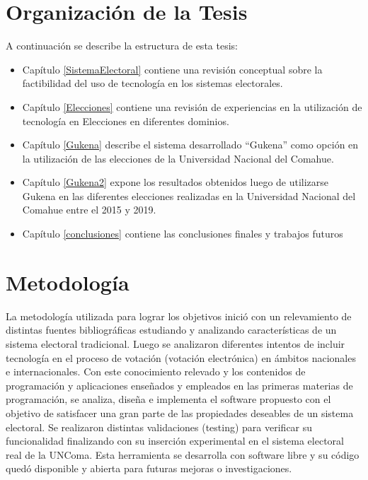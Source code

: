 \section{Organización de la Tesis}
A continuación se describe la estructura de esta tesis:
\begin{itemize}

    \item Capítulo \ref{SistemaElectoral} contiene una revisión conceptual sobre la factibilidad del uso de tecnología
    en los sistemas electorales.
    \item Capítulo \ref{Elecciones} contiene una revisión de experiencias en la utilización de tecnología en  Elecciones en diferentes dominios.
    \item Capítulo \ref{Gukena} describe el sistema desarrollado ``Gukena'' como opción en la utilización de las elecciones de la Universidad Nacional del Comahue.
    \item Capítulo \ref{Gukena2} expone los resultados obtenidos luego de utilizarse Gukena en las diferentes elecciones realizadas en la Universidad Nacional del Comahue entre el 2015 y 2019.
    \item Capítulo \ref{conclusiones} contiene las conclusiones finales y trabajos futuros
\end{itemize}

\section{Metodología}
La metodología utilizada para lograr los objetivos inició con un relevamiento de distintas fuentes bibliográficas estudiando y analizando características de un sistema electoral tradicional.
Luego se analizaron diferentes intentos de incluir tecnología en el proceso de votación (votación electrónica) en ámbitos nacionales e internacionales. Con este conocimiento relevado y los contenidos de programación y aplicaciones enseñados y empleados en las primeras materias de programación, se analiza, diseña e implementa el software propuesto con el objetivo de satisfacer una gran parte de las propiedades deseables de un sistema electoral. Se realizaron distintas validaciones (testing) para verificar su funcionalidad finalizando con su inserción experimental en el sistema electoral real de la UNComa. Esta herramienta se desarrolla con software libre y su código quedó disponible y abierta para futuras mejoras o investigaciones.

